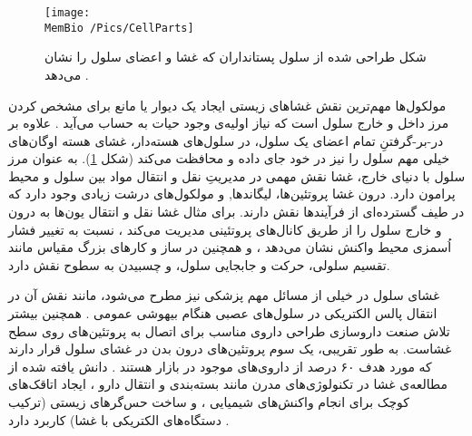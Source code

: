 


\begin{figure}[h]
\begin{center}
\texttt{[image: \\MemBio /Pics/CellParts]}
\caption{
شکل طراحی شده از سلول پستانداران که غشا و اعضای سلول را نشان می‌دهد
\cite{CellParts}.
}
\label{fig:cellparts}
\end{center}
\end{figure}

مولکول‌ها مهم‌ترین نقش غشاهای زیستی ایجاد یک دیوار یا مانع برای مشخص کردن مرز داخل و خارج سلول است که نیاز اولیه‌ی وجود حیات به حساب می‌آید
\cite{Boyle2008Biology}.
 علاوه بر در-بر-گرفتنِ تمام اعضای یک سلول، در سلول‌های هسته‌دار، غشای هسته اوگان‌های خیلی مهم سلول را نیز در خود جای داده و محافظت می‌کند (شکل
\ref{fig:cellparts}).
 به عنوان مرز سلول با دنیای خارج، غشا نقش مهمی در مدیریتِ نقل و انتقال مواد بین سلول و محیط پرامون دارد. درون غشا پروتئین‌ها، لیگاند‌ها,
و مولکول‌های درشت زیادی وجود دارد که در طیف‌ گسترده‌ای از فرآیندها نقش دارند. برای مثال غشا نقل و انتقال یون‌ها به درون و خارج سلول را از طریق کانال‌های پروتئینی مدیریت می‌کند
\cite{NEHER1976ProteinChannel}،
نسبت به تغییر فشار اُسمزی محیط واکنش نشان می‌دهد
\cite{Perozo2006Osmotic,Vasquez2009Osmotic,Haswell2011Osmotic}،
و همچنین در ساز و کار‌های بزرگ مقیاس مانند تقسیم سلولی، حرکت و جابجایی سلول، و چسبیدن به سطوح نقش دارد.


غشای سلول در خیلی از مسائل مهم پزشکی نیز مطرح می‌شود، مانند نقش آن در انتقال پالس الکتریکی در سلول‌های عصبی هنگام بیهوشی عمومی 
\cite{BioMemBook2007}.
همچنین بیشتر تلاش صنعت داروسازی طراحی داروی مناسب برای اتصال به پروتئین‌های روی سطح غشاست. به طور تقریبی، یک سوم پروتئین‌های درون بدن در غشای سلول قرار دارند که  مورد هدف ۶۰ درصد از داروی‌های موجود در بازار هستند
\cite{DrugDelivery2007}.
 دانش یافته شده از مطالعه‌ی غشا در تکنولوژی‌های مدرن مانند بسته‌بندی و انتقال دارو
\cite{Torchilin2006Drugdelivery}،
ایجاد اتاقک‌های کوچک برای انجام واکنش‌های شیمیایی
\cite{Karlsson2001MemChamber}،
 و ساخت حس‌گرهای زیستی (ترکیب دستگاه‌های الکتریکی با غشا) کاربرد دارد
\cite{MemeElctronics2012}.
